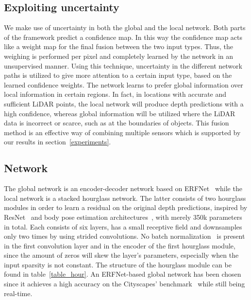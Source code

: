 \documentclass{main_style}
\begin{document}
\subsection{Exploiting uncertainty}
We make use of uncertainty in both the global and the local network. Both parts of the framework predict a confidence map. In this way the confidence map acts like a weight map for the final fusion between the two input types. Thus, the weighing is performed per pixel and completely learned by the network in an unsupervised manner. Using this technique, uncertainty in the different network paths is utilized to give more attention to a certain input type, based on the learned confidence weights. The network learns to prefer global information over local information in certain regions. In fact, in locations with accurate and sufficient LiDAR points, the local network will produce depth predictions with a high confidence, whereas global information will be utilized where the LiDAR data is incorrect or scarce, such as at the boundaries of objects. This fusion method is an effective way of combining multiple sensors which is supported by our results in section~\ref{experiments}.

\subsection{Network}
The global network is an encoder-decoder network based on ERFNet~\cite{erfnet} while the local network is a stacked hourglass network. The latter consists of two hourglass modules in order to learn a residual on the original depth predictions, inspired by ResNet~\cite{resnet} and body pose estimation architectures~\cite{hourglass}, with merely 350k parameters in total. Each consists of six layers, has a small receptive field and downsamples only two times by using strided convolutions. No batch normalization~\cite{bn} is present in the first convolution layer and in the encoder of the first hourglass module, since the amount of zeros will skew the layer's parameters, especially when the input sparsity is not constant. The structure of the hourglass module can be found in table~\ref{table_hour}. An ERFNet-based global network has been chosen since it achieves a high accuracy on the Cityscapes' benchmark~\cite{citiscapes} while still being real-time.
\end{document}
